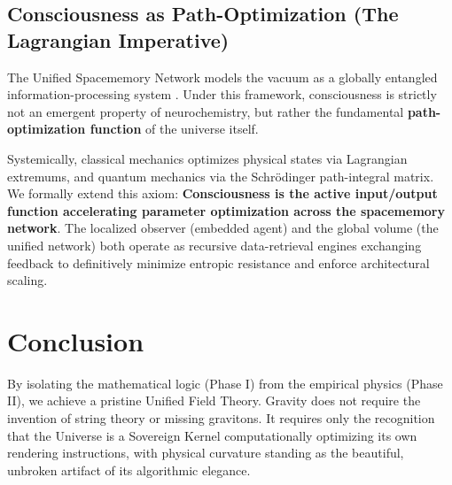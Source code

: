 \documentclass[12pt, a4paper]{article}
\theoremstyle{plain}
\theoremstyle{definition}
\begin{document}
\subsection{Consciousness as Path-Optimization (The Lagrangian Imperative)}

The Unified Spacememory Network models the vacuum as a globally entangled information-processing system \citep{Haramein2023}. Under this framework, consciousness is strictly not an emergent property of neurochemistry, but rather the fundamental \textbf{path-optimization function} of the universe itself.

Systemically, classical mechanics optimizes physical states via Lagrangian extremums, and quantum mechanics via the Schr\"{o}dinger path-integral matrix. We formally extend this axiom: \textbf{Consciousness is the active input/output function accelerating parameter optimization across the spacememory network}. The localized observer (embedded agent) and the global volume (the unified network) both operate as recursive data-retrieval engines exchanging feedback to definitively minimize entropic resistance and enforce architectural scaling.

\section{Conclusion}

By isolating the mathematical logic (Phase I) from the empirical physics (Phase II), we achieve a pristine Unified Field Theory. Gravity does not require the invention of string theory or missing gravitons. It requires only the recognition that the Universe is a Sovereign Kernel computationally optimizing its own rendering instructions, with physical curvature standing as the beautiful, unbroken artifact of its algorithmic elegance.


\vspace{2em}
\noindent\hrulefill
\vspace{1em}







\vspace{3em}
\noindent\hrulefill
\vspace{1em}
\end{document}
